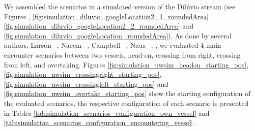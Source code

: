      We assembled the scenarios in a simulated version of the Dilúvio stream (see Figures , \ref{fig:simulation_diluvio_googleLocation2_1_roundedArea} \ref{fig:simulation_diluvio_googleLocation2_2_roundedArea} and \ref{fig:simulation_diluvio_googleLocation_roundedArea}). As done by several authors, \eg{} Larson \etal{} ~\cite{Larson2006Autonomous}, Naeem \etal{} ~\cite{Naeem2012COLREGS}, Campbell \etal{} ~\cite{Campbell2013Automatic}, Naus ~\cite{Naus2013Idea}, \etc{}, we evaluated 4 main encounter scenarios between two vessels, head-on, crossing from right, crossing from left, and overtaking. Figures \ref{fig:simulation_uwsim_headon_starting_pos}, \ref{fig:simulation_uwsim_crossingright_starting_pos}, \ref{fig:simulation_uwsim_crossingleft_starting_pos} and \ref{fig:simulation_uwsim_overtake_starting_pos} show the starting configuration of the evaluated scenarios, the respective configuration of each scenario is presented in Tables \ref{tab:simulation_scenarios_configuration_own_vessel} and \ref{tab:simulation_scenarios_configuration_encountering_vessel}.
    
